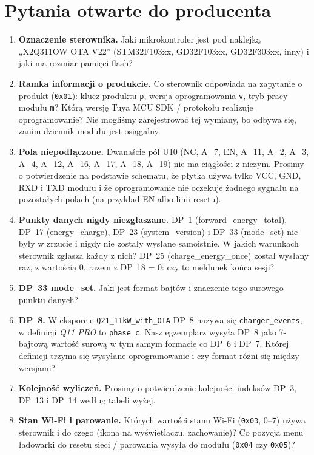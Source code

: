 \documentclass[11pt,a4paper]{article}
\newcommand{\hx}[1]{\texttt{#1}}
\begin{document}
\section{Pytania otwarte do producenta}

\begin{enumerate}
\item \textbf{Oznaczenie sterownika.} Jaki mikrokontroler jest pod naklejką „X2Q311OW OTA V22” (STM32F103xx, GD32F103xx, GD32F303xx, inny) i jaki ma rozmiar pamięci flash?
\item \textbf{Ramka informacji o produkcie.} Co sterownik odpowiada na zapytanie o produkt (\hx{0x01}): klucz produktu \texttt{p}, wersja oprogramowania \texttt{v}, tryb pracy modułu \texttt{m}? Którą wersję Tuya MCU SDK / protokołu realizuje oprogramowanie? Nie mogliśmy zarejestrować tej wymiany, bo odbywa się, zanim dziennik modułu jest osiągalny.
\item \textbf{Pola niepodłączone.} Dwanaście pól U10 (NC, A\_7, EN, A\_11, A\_2, A\_3, A\_4, A\_12, A\_16, A\_17, A\_18, A\_19) nie ma ciągłości z niczym. Prosimy o potwierdzenie na podstawie schematu, że płytka używa tylko VCC, GND, RXD i TXD modułu i że oprogramowanie nie oczekuje żadnego sygnału na pozostałych polach (na przykład EN albo linii resetu).
\item \textbf{Punkty danych nigdy niezgłaszane.} DP~1 (forward\_energy\_total), DP~17 (energy\_charge), DP~23 (system\_version) i DP~33 (mode\_set) nie były w zrzucie i nigdy nie zostały wysłane samoistnie. W jakich warunkach sterownik zgłasza każdy z nich? DP~25 (charge\_energy\_once) został wysłany raz, z wartością 0, razem z DP~18 = 0: czy to meldunek końca sesji?
\item \textbf{DP~33 mode\_set.} Jaki jest format bajtów i znaczenie tego surowego punktu danych?
\item \textbf{DP~8.} W eksporcie \texttt{Q21\_11kW\_with\_OTA} DP~8 nazywa się \texttt{charger\_events}, w definicji \emph{Q11 PRO} to \texttt{phase\_c}. Nasz egzemplarz wysyła DP~8 jako 7-bajtową wartość surową w tym samym formacie co DP~6 i DP~7. Której definicji trzyma się wysyłane oprogramowanie i czy format różni się między wersjami?
\item \textbf{Kolejność wyliczeń.} Prosimy o potwierdzenie kolejności indeksów DP~3, DP~13 i DP~14 według tabeli wyżej.
\item \textbf{Stan Wi-Fi i parowanie.} Których wartości stanu Wi-Fi (\hx{0x03}, 0--7) używa sterownik i do czego (ikona na wyświetlaczu, zachowanie)? Co pozycja menu ładowarki do resetu sieci / parowania wysyła do modułu (\hx{0x04} czy \hx{0x05})?

\end{enumerate}
\end{document}
